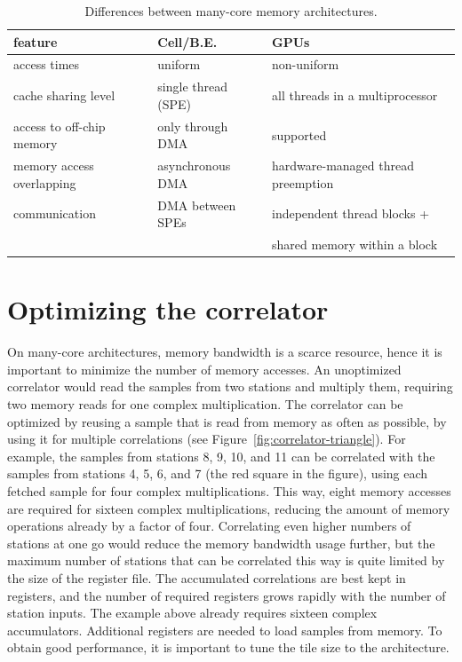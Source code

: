 \documentclass{article}
\begin{document}
\begin{table}[t]
\begin{center}
{\small
\begin{tabular}{l|l|l}
feature                   & Cell/B.E.                      & GPUs \\
\hline
access times              & uniform                        & non-uniform \\
cache sharing level       & single thread (SPE)            & all threads in a multiprocessor \\
access to off-chip memory & only through DMA               & supported \\
memory access overlapping & asynchronous DMA               & hardware-managed thread preemption \\
communication             & DMA between SPEs               & independent thread blocks + \\
                          &                                & shared memory within a block \\
\end{tabular}
} %
\end{center}
\vspace{-0.5cm}
\caption{Differences between many-core memory architectures.}
\label{memory-properties}
\end{table}


\section{Optimizing the correlator}

On many-core architectures, memory bandwidth is a scarce resource, hence it is
important to minimize the number of memory accesses.
An unoptimized correlator would read the samples from two stations and
multiply them, requiring two memory reads for one complex multiplication.
The correlator can be optimized by reusing a sample that is read from memory
as often as possible, by using it for multiple correlations (see
Figure~\ref{fig:correlator-triangle}).
For example, the samples from stations 8, 9, 10, and 11 can be correlated
with the samples from stations 4, 5, 6, and 7 (the red square in the figure),
using each fetched sample for four complex multiplications.
This way, eight memory accesses are required for sixteen complex
multiplications, reducing the amount of memory operations already by a factor
of four.
Correlating even higher numbers of stations at one go would reduce the
memory bandwidth usage further, but the maximum number of stations that can
be correlated this way is quite limited by the size of the register file.
The accumulated correlations are best kept in registers, and the number of
required registers grows rapidly with the number of station inputs.
The example above already requires sixteen complex accumulators.
Additional registers are needed to load samples from memory.
To obtain good performance, it is important to tune the tile size to the
architecture.
\end{document}
